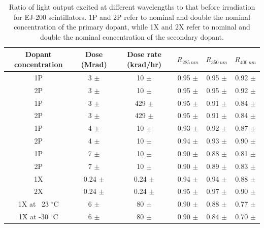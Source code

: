 \documentclass[preprint,12pt]{elsarticle}
\begin{document}
\begin{table}[!ht]
\centering
  \caption{Ratio of light output excited at different wavelengths to that before irradiation for EJ-200 scintillators. 
1P and 2P refer to nominal and double the nominal concentration of the primary dopant, 
while 1X and 2X refer to nominal and double the nominal concentration of the secondary dopant.}	
  \begin{tabular}{c|c|c|c|c|c}
    \hline
    Dopant concentration & Dose (Mrad) 	& Dose rate (krad/hr)    &$R_{285~nm}$	&$R_{350~nm}$	&$R_{400~nm}$	\\ \hline
    1P     	    	 & 3 $\pm$  	& 10 $\pm$  	   	 &0.95 $\pm$	&0.95 ${\pm}$	&0.92 ${\pm}$	\\ 
    2P     	    	 & 3 $\pm$  	& 10 $\pm$  	   	 &0.95 ${\pm}$	&0.95 ${\pm}$	&0.92 ${\pm}$	\\ \hline
    1P			 & 3 $\pm$	& 429 $\pm$		 &0.95 ${\pm}$	&0.91 ${\pm}$	&0.84 ${\pm}$	\\ 
    2P			 & 3 $\pm$	& 429 $\pm$		 &0.95 ${\pm}$	&0.91 ${\pm}$	&0.84 ${\pm}$	\\ \hline
    1P     	    	 & 4 $\pm$  	& 10 $\pm$  	   	 &0.93 ${\pm}$	&0.92 ${\pm}$	&0.87 ${\pm}$	\\ 
    2P     	    	 & 4 $\pm$  	& 10 $\pm$  	   	 &0.94 ${\pm}$	&0.93 ${\pm}$	&0.90 ${\pm}$	\\ \hline
    1P			 & 7 $\pm$	& 10 $\pm$		 &0.90 ${\pm}$	&0.88 ${\pm}$	&0.81 ${\pm}$	\\ 
    2P			 & 7 $\pm$	& 10 $\pm$		 &0.90 ${\pm}$	&0.89 ${\pm}$	&0.83 ${\pm}$	\\ \hline
    1X     	    	 & 0.24 $\pm$  	& 0.24 $\pm$  	   	 &0.94 ${\pm}$	&0.94 ${\pm}$	&0.88 ${\pm}$	\\ 
    2X     	    	 & 0.24 $\pm$  	& 0.24 $\pm$  	   	 &0.95 ${\pm}$	&0.97 ${\pm}$	&0.90 ${\pm}$	\\ \hline
    1X at ~23 $^\circ$C	 & 6 $\pm$	& 80 $\pm$		 &0.90 ${\pm}$	&0.88 ${\pm}$	&0.77 ${\pm}$	\\ 
    1X at -30 $^\circ$C	 & 6 $\pm$	& 80 $\pm$		 &0.90 ${\pm}$	&0.84 ${\pm}$	&0.70 ${\pm}$	\\
    \hline
  \end{tabular}
  \label{table:light-yield-ratio}
\end{table}



\end{document}
